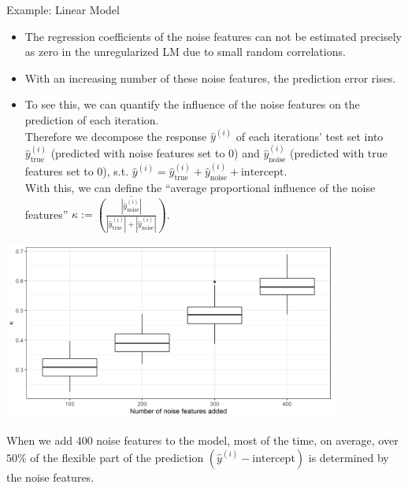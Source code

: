 \begin{vbframe}{Example: Linear Model}
\framebreak
\begin{itemize}
\item The regression coefficients of the noise features can not be estimated precisely as zero in the unregularized LM due to small random correlations. 
\item With an increasing number of these noise features, the prediction error rises.
\item To see this, we can quantify the influence of the noise features on the prediction of each iteration. \\ 
Therefore we decompose the response $\hat y^{(i)}$ of each iterations' test set into $\hat y^{(i)}_{\text{true}}$ (predicted with noise features set to 0) and $\hat y^{(i)}_{\text{noise}}$ (predicted with true features set to 0), s.t. $\hat y^{(i)} =  \hat y^{(i)}_{\text{true}} + \hat y^{(i)}_{\text{noise}} + \text{intercept}$. \\
With this, we can define the \enquote{average proportional influence of the noise features} $\kappa := \overline{\left( \frac{|\hat y^{(i)}_{\text{noise}}|}{|\hat y^{(i)}_{\text{true}}| + |\hat y^{(i)}_{\text{noise}}|} \right)}$.

\end{itemize}
\framebreak

\begin{center}
\includegraphics[width = 11cm ]{figure/lm_noise_plot.png}
\end{center}

When we add 400 noise features to the model, most of the time, on average, over $50\%$ of the flexible part of the prediction $(\hat y^{(i)} - \text{intercept})$ is determined by the noise features.

\end{vbframe} 

